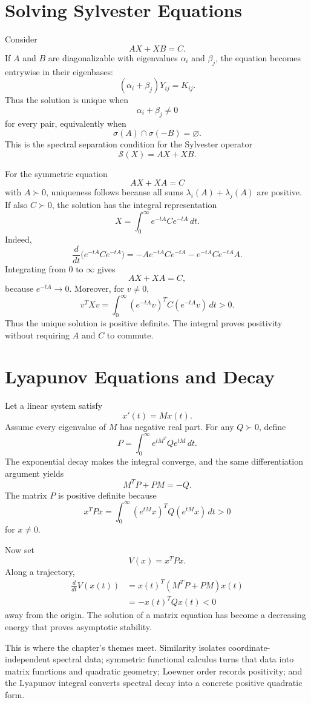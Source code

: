 \section{Solving Sylvester Equations}

Consider
\[
  AX+XB=C.
\]
If \(A\) and \(B\) are diagonalizable with eigenvalues \(\alpha_i\) and \(\beta_j\), the equation becomes entrywise in their eigenbases:
\[
  (\alpha_i+\beta_j)Y_{ij}=K_{ij}.
\]
Thus the solution is unique when
\[
  \alpha_i+\beta_j\ne0
\]
for every pair, equivalently when
\[
  \sigma(A)\cap\sigma(-B)=\varnothing.
\]
This is the spectral separation condition for the Sylvester operator
\[
  \mathcal S(X)=AX+XB.
\]

For the symmetric equation
\[
  AX+XA=C
\]
with \(A\succ0\), uniqueness follows because all sums \(\lambda_i(A)+\lambda_j(A)\) are positive.  If also \(C\succ0\), the solution has the integral representation
\[
  \boxed{
  X=\int_0^\infty e^{-tA}Ce^{-tA}\,dt.}
\]
Indeed,
\[
  \frac d{dt}
  \bigl(e^{-tA}Ce^{-tA}\bigr)
  =-Ae^{-tA}Ce^{-tA}
   -e^{-tA}Ce^{-tA}A.
\]
Integrating from \(0\) to \(\infty\) gives
\[
  AX+XA=C,
\]
because \(e^{-tA}\to0\).  Moreover, for \(v\ne0\),
\[
  v^TXv
  =\int_0^\infty
  (e^{-tA}v)^TC(e^{-tA}v)\,dt>0.
\]
Thus the unique solution is positive definite.  The integral proves positivity without requiring \(A\) and \(C\) to commute.

\section{Lyapunov Equations and Decay}

Let a linear system satisfy
\[
  x'(t)=Mx(t).
\]
Assume every eigenvalue of \(M\) has negative real part.  For any \(Q\succ0\), define
\[
  P=\int_0^\infty e^{tM^T}Qe^{tM}\,dt.
\]
The exponential decay makes the integral converge, and the same differentiation argument yields
\[
  M^TP+PM=-Q.
\]
The matrix \(P\) is positive definite because
\[
  x^TPx
  =\int_0^\infty
  (e^{tM}x)^TQ(e^{tM}x)\,dt>0
\]
for \(x\ne0\).

Now set
\[
  V(x)=x^TPx.
\]
Along a trajectory,
\[
\begin{aligned}
  \frac d{dt}V(x(t))
  &=x(t)^T(M^TP+PM)x(t)\\
  &=-x(t)^TQx(t)<0
\end{aligned}
\]
away from the origin.  The solution of a matrix equation has become a decreasing energy that proves asymptotic stability.

This is where the chapter's themes meet.  Similarity isolates coordinate-independent spectral data; symmetric functional calculus turns that data into matrix functions and quadratic geometry; Loewner order records positivity; and the Lyapunov integral converts spectral decay into a concrete positive quadratic form.